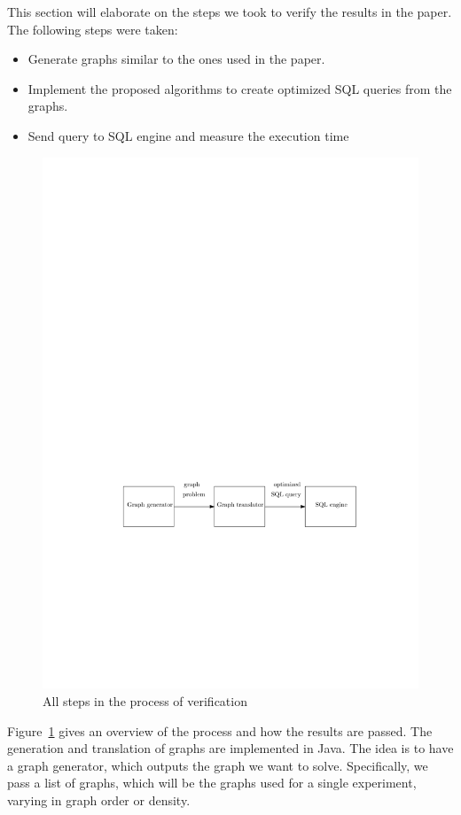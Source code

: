 This section will elaborate on the steps we took to verify the results in the paper. The following steps were taken:

\begin{itemize}
	\item Generate graphs similar to the ones used in the paper.
	\item Implement the proposed algorithms to create optimized SQL queries from the graphs.
	\item Send query to SQL engine and measure the execution time
\end{itemize}

\begin{figure}
	\includegraphics{figures/process.pdf}
	\caption{All steps in the process of verification}
	\label{fig:process}
\end{figure}

\noindent Figure~\ref{fig:process} gives an overview of the process and how the results are passed. The generation and translation of graphs are implemented in Java. The idea is to have a graph generator, which outputs the graph we want to solve. Specifically, we pass a list of graphs, which will be the graphs used for a single experiment, varying in graph order or density. \\

